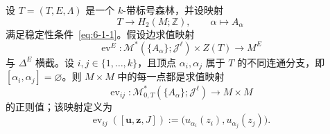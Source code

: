 \begin{theorem}\label{thm:6-3-1}
设 $T=(T,E,\Lambda)$ 是一个 $k$-带标号森林，并设映射
\[
  T\longrightarrow H_2(M;\mathbb Z),
  \qquad \alpha\longmapsto A_\alpha
\]
满足稳定性条件~\eqref{eq:6-1-1}。假设边求值映射
\[
  \operatorname{ev}^E:
  \mathcal M^*(\{A_\alpha\};\mathcal J^\ell)\times Z(T)
  \longrightarrow M^E
\]
与 $\Delta^E$ 横截。设 $i,j\in\{1,\ldots,k\}$，且顶点
$\alpha_i,\alpha_j$ 属于 $T$ 的不同连通分支，即
$[\alpha_i,\alpha_j]=\varnothing$。则 $M\times M$ 中的每一点都是求值映射
\[
  \operatorname{ev}_{ij}:
  \mathcal M^*_{0,T}(\{A_\alpha\};\mathcal J^\ell)
  \longrightarrow M\times M
\]
的正则值；该映射定义为
\[
  \operatorname{ev}_{ij}([\mathbf u,\mathbf z,J])
  :=\bigl(u_{\alpha_i}(z_i),u_{\alpha_j}(z_j)\bigr).
\]
\end{theorem}

